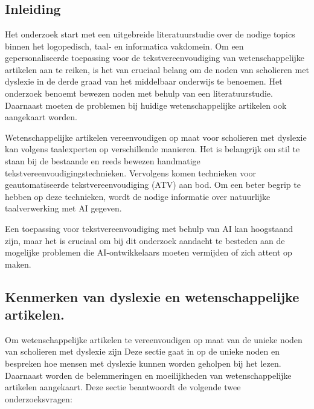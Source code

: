\chapter{}%
\label{ch:stand-van-zaken}

\section{Inleiding}

Het onderzoek start met een uitgebreide literatuurstudie over de nodige topics binnen het logopedisch, taal- en informatica vakdomein. Om een gepersonaliseerde toepassing voor de tekstvereenvoudiging van wetenschappelijke artikelen aan te reiken, is het van cruciaal belang om de noden van scholieren met dyslexie in de derde graad van het middelbaar onderwijs te benoemen. Het onderzoek benoemt bewezen noden met behulp van een literatuurstudie. Daarnaast moeten de problemen bij huidige wetenschappelijke artikelen ook aangekaart worden. 

\medspace

Wetenschappelijke artikelen vereenvoudigen op maat voor scholieren met dyslexie kan volgens taalexperten op verschillende manieren. Het is belangrijk om stil te staan bij de bestaande en reeds bewezen handmatige tekstvereenvoudigingstechnieken. Vervolgens komen technieken voor geautomatiseerde tekstvereenvoudiging (ATV) aan bod. Om een beter begrip te hebben op deze technieken, wordt de nodige informatie over natuurlijke taalverwerking met AI gegeven.

\medspace

Een toepassing voor tekstvereenvoudiging met behulp van AI kan hoogstaand zijn, maar het is cruciaal om bij dit onderzoek aandacht te besteden aan de mogelijke problemen die AI-ontwikkelaars moeten vermijden of zich attent op maken.

\section{Kenmerken van dyslexie en wetenschappelijke artikelen.}

Om wetenschappelijke artikelen te vereenvoudigen op maat van de unieke noden van scholieren met dyslexie zijn Deze sectie gaat in op de unieke noden en bespreken hoe mensen met dyslexie kunnen worden geholpen bij het lezen. Daarnaast worden de belemmeringen en moeilijkheden van wetenschappelijke artikelen aangekaart. Deze sectie beantwoordt de volgende twee onderzoeksvragen: 

